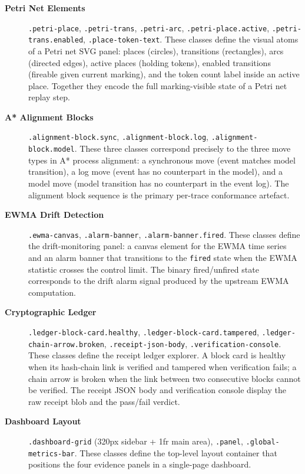 \begin{description}
  \item[\textbf{Petri Net Elements}]
    \texttt{.petri-place}, \texttt{.petri-trans}, \texttt{.petri-arc},
    \texttt{.petri-place.active}, \texttt{.petri-trans.enabled}, \texttt{.place-token-text}.
    These classes define the visual atoms of a Petri net SVG panel: places (circles),
    transitions (rectangles), arcs (directed edges), active places (holding tokens),
    enabled transitions (fireable given current marking), and the token count label inside
    an active place. Together they encode the full marking-visible state of a Petri net
    replay step.

  \item[\textbf{A{*} Alignment Blocks}]
    \texttt{.alignment-block.sync}, \texttt{.alignment-block.log},
    \texttt{.alignment-block.model}. These three classes correspond precisely to the three
    move types in A{*} process alignment: a synchronous move (event matches model transition),
    a log move (event has no counterpart in the model), and a model move (model transition
    has no counterpart in the event log). The alignment block sequence is the primary
    per-trace conformance artefact.

  \item[\textbf{EWMA Drift Detection}]
    \texttt{.ewma-canvas}, \texttt{.alarm-banner}, \texttt{.alarm-banner.fired}. These
    classes define the drift-monitoring panel: a canvas element for the EWMA time series
    and an alarm banner that transitions to the \texttt{fired} state when the EWMA statistic
    crosses the control limit. The binary fired/unfired state corresponds to the drift alarm
    signal produced by the upstream EWMA computation.

  \item[\textbf{Cryptographic Ledger}]
    \texttt{.ledger-block-card.healthy}, \texttt{.ledger-block-card.tampered},
    \texttt{.ledger-chain-arrow.broken}, \texttt{.receipt-json-body},
    \texttt{.verification-console}. These classes define the receipt ledger explorer.
    A block card is healthy when its hash-chain link is verified and tampered when
    verification fails; a chain arrow is broken when the link between two consecutive
    blocks cannot be verified. The receipt JSON body and verification console display
    the raw receipt blob and the pass/fail verdict.

  \item[\textbf{Dashboard Layout}]
    \texttt{.dashboard-grid} (320px sidebar + 1fr main area), \texttt{.panel},
    \texttt{.global-metrics-bar}. These classes define the top-level layout container
    that positions the four evidence panels in a single-page dashboard.
\end{description}

